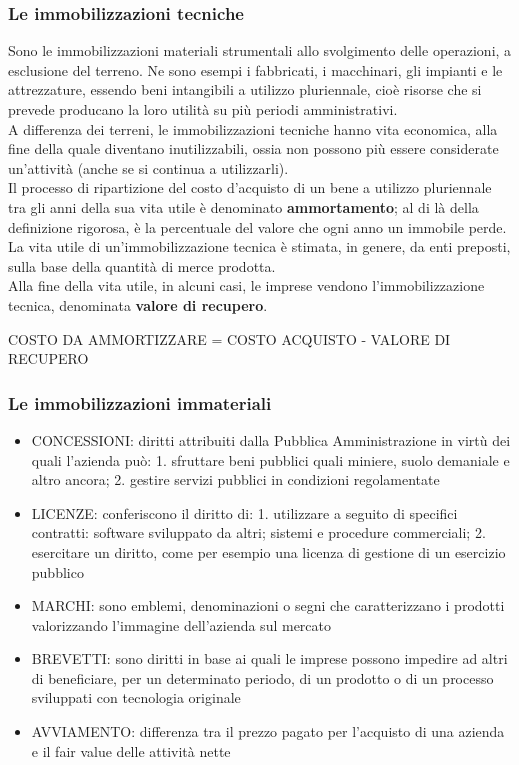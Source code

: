 \documentclass{article}
\begin{document}
\subsubsection{Le immobilizzazioni tecniche}
Sono le immobilizzazioni materiali strumentali allo svolgimento delle operazioni, a esclusione del terreno. Ne sono esempi i fabbricati, i macchinari, gli impianti e le attrezzature, essendo beni intangibili a utilizzo
pluriennale, cioè risorse che si prevede producano la loro utilità su più periodi
amministrativi.
\vspace*{0.2cm}\\
A differenza dei terreni, le immobilizzazioni tecniche hanno vita economica, alla fine della
quale diventano inutilizzabili, ossia non possono più essere considerate un'attività (anche se si continua a utilizzarli).
\vspace*{0.2cm}\\
Il processo di ripartizione del costo d'acquisto di un bene a utilizzo pluriennale tra gli
anni della sua vita utile è denominato \textbf{\color{violet} ammortamento}; al di là della definizione rigorosa, è la percentuale del valore che ogni anno un immobile perde. La vita utile di un'immobilizzazione tecnica è stimata, in genere, da enti preposti, sulla base della quantità di merce prodotta.\\
Alla fine della vita utile, in alcuni casi, le imprese vendono l'immobilizzazione tecnica, denominata \textbf{valore di recupero}.
\begin{center}
    COSTO DA AMMORTIZZARE = COSTO ACQUISTO - VALORE DI RECUPERO
\end{center}


\subsubsection{Le immobilizzazioni immateriali}
\begin{itemize}
    \item CONCESSIONI: diritti attribuiti dalla Pubblica Amministrazione in virtù dei quali l'azienda può: 1. sfruttare beni pubblici quali miniere, suolo demaniale e altro ancora; 2. gestire servizi pubblici in condizioni regolamentate
    \item LICENZE: conferiscono il diritto di: 1. utilizzare a seguito di specifici contratti: software sviluppato da altri; sistemi e procedure commerciali; 2. esercitare un diritto, come per esempio una licenza di gestione di un esercizio pubblico
    \item MARCHI: sono emblemi, denominazioni o segni che caratterizzano i prodotti valorizzando l'immagine dell'azienda sul mercato
    \item BREVETTI: sono diritti in base ai quali le imprese possono impedire ad altri di beneficiare, per un determinato periodo, di un prodotto o di un processo sviluppati con tecnologia originale
    \item AVVIAMENTO: differenza tra il prezzo pagato per l'acquisto di una azienda e il fair value delle attività nette
\end{itemize}
\end{document}
